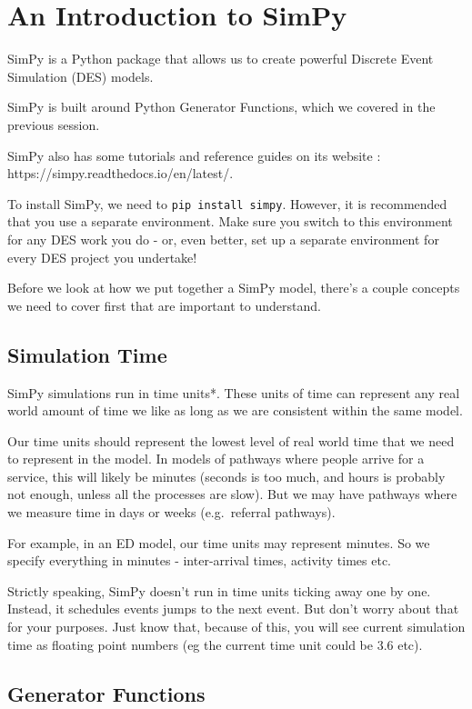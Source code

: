 \documentclass[
  letterpaper,
  DIV=11,
  numbers=noendperiod]{scrreprt}
\begin{document}
\chapter{An Introduction to SimPy}\label{an-introduction-to-simpy}

SimPy is a Python package that allows us to create powerful Discrete
Event Simulation (DES) models.

SimPy is built around Python Generator Functions, which we covered in
the previous session.

SimPy also has some tutorials and reference guides on its website :
https://simpy.readthedocs.io/en/latest/.

To install SimPy, we need to \texttt{pip\ install\ simpy}. However, it
is recommended that you use a separate environment. Make sure you switch
to this environment for any DES work you do - or, even better, set up a
separate environment for every DES project you undertake!

Before we look at how we put together a SimPy model, there's a couple
concepts we need to cover first that are important to understand.

\section{Simulation Time}\label{simulation-time}

SimPy simulations run in time units*. These units of time can represent
any real world amount of time we like as long as we are consistent
within the same model.

Our time units should represent the lowest level of real world time that
we need to represent in the model. In models of pathways where people
arrive for a service, this will likely be minutes (seconds is too much,
and hours is probably not enough, unless all the processes are slow).
But we may have pathways where we measure time in days or weeks
(e.g.~referral pathways).

For example, in an ED model, our time units may represent minutes. So we
specify everything in minutes - inter-arrival times, activity times etc.

Strictly speaking, SimPy doesn't run in time units ticking away one by
one. Instead, it schedules events jumps to the next event. But don't
worry about that for your purposes. Just know that, because of this, you
will see current simulation time as floating point numbers (eg the
current time unit could be 3.6 etc).

\section{Generator Functions}\label{generator-functions}
\end{document}
